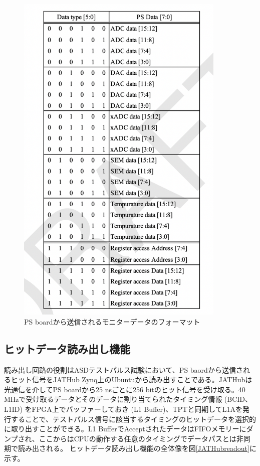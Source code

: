 \begin{figure} 
\centering
\includegraphics[width=10cm]{fig/QAQC/PSBdataformat.png}
\caption[PS boardから送信されるモニターデータのフォーマット]{PS boardから送信されるモニターデータのフォーマット}
\label{PSBdataformat}
\end{figure}

\subsection*{ヒットデータ読み出し機能}
\label{subsubsec_DAQ}
読み出し回路の役割はASDテストパルス試験において、PS baordから送信されるヒット信号をJATHub Zynq上のUbuntuから読み出すことである。JATHubは光通信を介してPS boardから25 nsごとに256 bitのヒット信号を受け取る。40 MHzで受け取るデータとそのデータに割り当てられたタイミング情報 (BCID、L1ID) をFPGA上でバッファーしておき (L1 Buffer)、TPTと同期してL1Aを発行することで、テストパルス信号に該当するタイミングのヒットデータを選択的に取り出すことができる。L1 BufferでAcceptされたデータはFIFOメモリーにダンプされ、ここからはCPUの動作する任意のタイミングでデータパスとは非同期で読み出される。
ヒットデータ読み出し機能の全体像を図\ref{JATHubreadout}に示す。

